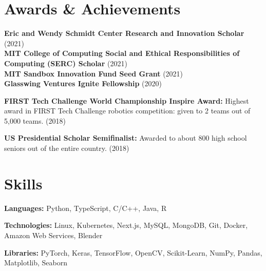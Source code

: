 \documentclass[letterpaper,11pt]{article}
\newcommand{\resumeSubHeadingListStart}{\begin{itemize}[leftmargin=0.15in, label={}]}
\newcommand{\resumeSubHeadingListEnd}{\end{itemize}}
\begin{document}
\section{Awards \& Achievements}
  \vspace{2pt}
  \resumeSubHeadingListStart
    \small{\item{
        \textbf{Eric and Wendy Schmidt Center Research and Innovation Scholar}{ (2021)} \\ \vspace{3pt}
        \textbf{MIT College of Computing Social and Ethical Responsibilities of Computing (SERC) Scholar}{ (2021)} \\ \vspace{3pt}
        \textbf{MIT Sandbox Innovation Fund Seed Grant}{ (2021)} \\ \vspace{3pt}
        \textbf{Glasswing Ventures Ignite Fellowship}{ (2020)} \\ \vspace{3pt}

        \textbf{FIRST Tech Challenge World Championship Inspire Award:}{ Highest award in FIRST Tech Challenge robotics competition: given to 2 teams out of 5,000 teams. (2018)} \\ \vspace{3pt}

        \textbf{US Presidential Scholar Semifinalist:}{ Awarded to about 800 high school seniors out of the entire country. (2018)} \\ \vspace{3pt}
  
    }}
  \resumeSubHeadingListEnd


\section{Skills}
  \vspace{2pt}
  \resumeSubHeadingListStart
    \small{\item{
        
        \textbf{Languages:}{ Python, TypeScript, C/C++, Java, R} \\ \vspace{3pt}
        
        \textbf{Technologies:}{ Linux, Kubernetes, Next.js, MySQL, MongoDB, Git, Docker, Amazon Web Services, Blender } \\ \vspace{3pt}

        \textbf{Libraries:}{ PyTorch, Keras, TensorFlow, OpenCV, Scikit-Learn, NumPy, Pandas, Matplotlib, Seaborn} \\ \vspace{3pt}
        
    }}
  \resumeSubHeadingListEnd
\end{document}
